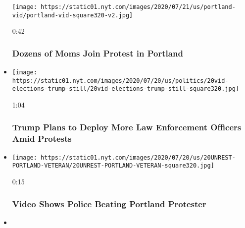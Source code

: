 \begin{itemize}
  \texttt{[image: https://static01.nyt.com/images/2020/07/21/us/portland-vid/portland-vid-square320-v2.jpg]}

  0:42

  \hypertarget{dozens-of-moms-join-protest-in-portland}{%
  \subsubsection{Dozens of Moms Join Protest in
  Portland}\label{dozens-of-moms-join-protest-in-portland}}
\item
  \href{https://www.nytimes.com/video/us/100000007247868/trump-deploy-federal-agents.html?action=click\&module=video-series-bar\&region=header\&pgtype=Article\&playlistId=video/minneapolis-george-floyd-death-video}{}

  \texttt{[image: https://static01.nyt.com/images/2020/07/20/us/politics/20vid-elections-trump-still/20vid-elections-trump-still-square320.jpg]}

  1:04

  \hypertarget{trump-plans-to-deploy-more-law-enforcement-officers-amid-protests}{%
  \subsubsection{Trump Plans to Deploy More Law Enforcement Officers
  Amid
  Protests}\label{trump-plans-to-deploy-more-law-enforcement-officers-amid-protests}}
\item
  \href{https://www.nytimes.com/video/us/100000007247168/video-shows-police-beating-portland-protester.html?action=click\&module=video-series-bar\&region=header\&pgtype=Article\&playlistId=video/minneapolis-george-floyd-death-video}{}

  \texttt{[image: https://static01.nyt.com/images/2020/07/20/us/20UNREST-PORTLAND-VETERAN/20UNREST-PORTLAND-VETERAN-square320.jpg]}

  0:15

  \hypertarget{video-shows-police-beating-portland-protester}{%
  \subsubsection{Video Shows Police Beating Portland
  Protester}\label{video-shows-police-beating-portland-protester}}
\item
  \href{https://www.nytimes.com/video/us/100000007241193/george-floyd-civil-lawsuit-minneapolis.html?action=click\&module=video-series-bar\&region=header\&pgtype=Article\&playlistId=video/minneapolis-george-floyd-death-video}{}


\end{itemize}
